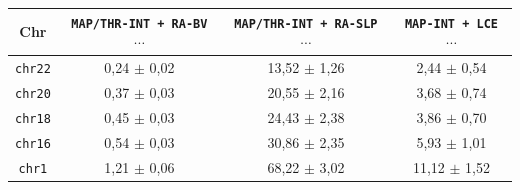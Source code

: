 \begin{table}
\begin{tabular}{c||c|c|c}
    \textbf{Chr}
    & \textbf{\texttt{MAP/THR-INT + RA-BV $\cdots$}}
    & \textbf{\texttt{MAP/THR-INT + RA-SLP $\cdots$}}
    & \textbf{\texttt{MAP-INT + LCE $\cdots$}}\\
    \hline
    \hline
    \texttt{chr22} & 0,24 $\pm$ 0,02 & 13,52 $\pm$ 1,26 & 2,44 $\pm$ 0,54 \\
    \texttt{chr20} & 0,37 $\pm$ 0,03 & 20,55 $\pm$ 2,16 & 3,68 $\pm$ 0,74 \\
    \texttt{chr18} & 0,45 $\pm$ 0,03 & 24,43 $\pm$ 2,38 & 3,86 $\pm$ 0,70 \\
    \texttt{chr16} & 0,54 $\pm$ 0,03 & 30,86 $\pm$ 2,35 & 5,93 $\pm$ 1,01 \\
    \texttt{chr1} & 1,21 $\pm$ 0,06 & 68,22 $\pm$ 3,02 & 11,12 $\pm$ 1,52

  \end{tabular}
\end{table}

